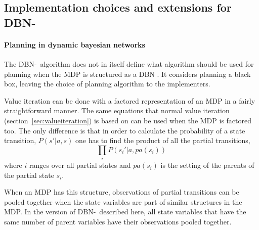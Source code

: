 \subsection{Implementation choices and extensions for DBN-\etre}
\label{sec:e3_our_contribution}

\paragraph{Planning in dynamic bayesian networks}

The DBN-\etre\ algorithm does not in itself define what algorithm should be
used for planning when the MDP is structured as a DBN
\parencite{kearns1999efficient}. It considers planning a black box, leaving the
choice of planning algorithm to the implementers. 

Value iteration can be done with a factored representation of an MDP in a
fairly straightforward manner. The same equations that normal value iteration
(section~\ref{sec:valueiteration}) is based on can be used when the MDP is
factored too. The only difference is that in order to calculate the probability
of a state transition, $P(s'| a, s)$ one has to find the product of all the
partial transitions,
\begin{equation}
  \prod\limits _{i} P\left(s_i' | a, pa(s_i)\right)
\end{equation}
where $i$ ranges over all partial states and $pa(s_i)$ is the setting of the
parents of the partial state $s_i$.

When an MDP has this structure, observations of partial transitions can be
pooled together when the state variables are part of similar structures in the
MDP. In the version of DBN-\etre\ described here, all state variables that have
the same number of parent variables have their observations pooled together. 


